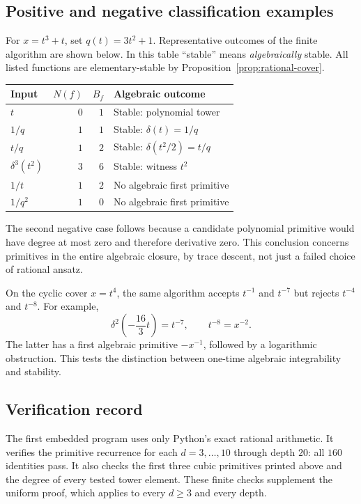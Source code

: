 \subsection{Positive and negative classification examples}
For $x=t^3+t$, set $q(t)=3t^2+1$. Representative outcomes of the finite
algorithm are shown below. In this table ``stable'' means
\emph{algebraically} stable. All listed functions are elementary-stable
by Proposition~\ref{prop:rational-cover}.
\begin{center}
\begin{tabular}{@{}lrrl@{}}
\toprule
Input & $N(f)$ & $B_f$ & Algebraic outcome\\
\midrule
$t$ & $0$ & $1$ & Stable: polynomial tower\\
$1/q$ & $1$ & $1$ & Stable: $\delta(t)=1/q$\\
$t/q$ & $1$ & $2$ & Stable: $\delta(t^2/2)=t/q$\\
$\delta^3(t^2)$ & $3$ & $6$ & Stable: witness $t^2$\\
$1/t$ & $1$ & $2$ & No algebraic first primitive\\
$1/q^2$ & $1$ & $0$ & No algebraic first primitive\\
\bottomrule
\end{tabular}
\end{center}
The second negative case follows because a candidate polynomial
primitive would have degree at most zero and therefore derivative zero.
This conclusion concerns primitives in the entire algebraic closure,
by trace descent, not just a failed choice of rational ansatz.

On the cyclic cover $x=t^4$, the same algorithm accepts $t^{-1}$ and
$t^{-7}$ but rejects $t^{-4}$ and $t^{-8}$. For example,
\[
 \delta^2\left(-\frac{16}{3}t\right)=t^{-7},\qquad
 t^{-8}=x^{-2}.
\]
The latter has a first algebraic primitive $-x^{-1}$, followed by a
logarithmic obstruction. This tests the distinction between one-time
algebraic integrability and stability.

\subsection{Verification record}
The first embedded program uses only Python's exact rational arithmetic.
It verifies the primitive recurrence for each $d=3,\ldots,10$ through
depth $20$: all $160$ identities pass. It also checks the first three
cubic primitives printed above and the degree of every tested tower
element. These finite checks supplement the uniform proof, which
applies to every $d\ge3$ and every depth.

